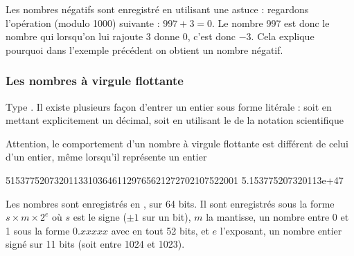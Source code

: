 \documentclass[letterpaper,10pt,english]{sphinxhowto}
\begin{document}
\sphinxAtStartPar
Les nombres négatifs sont enregistré en utilisant une astuce : regardons l’opération (modulo 1000) suivante : \(997 + 3 = 0\). Le nombre 997 est donc le nombre qui lorsqu’on lui rajoute 3 donne 0, c’est donc \(-3\). Cela explique pourquoi dans l’exemple précédent on obtient un nombre négatif.


\subsubsection{Les nombres à virgule flottante}
\label{\detokenize{cours2_nombres_cours:les-nombres-a-virgule-flottante}}
\sphinxAtStartPar
Type . Il existe plusieurs façon d’entrer un entier sous forme litérale : soit en mettant explicitement un  décimal, soit en utilisant le  de la notation scientifique

\begin{sphinxVerbatim}[commandchars=\\\{\}]
  
   
\end{sphinxVerbatim}

\sphinxAtStartPar
Attention, le comportement d’un nombre à virgule flottante est différent de celui d’un entier, même lorsqu’il représente un entier

\begin{sphinxVerbatim}[commandchars=\\\{\}]
  
   
\end{sphinxVerbatim}

\begin{sphinxVerbatim}[commandchars=\\\{\}]
515377520732011331036461129765621272702107522001
5.153775207320113e+47
\end{sphinxVerbatim}

\sphinxAtStartPar
Les nombres sont enregistrés en , sur 64 bits. Il sont enregistrés sous la forme \(s\times m \times 2^e\) où \(s\) est le signe (\(\pm 1\) sur un bit), \(m\) la mantisse, un nombre entre 0 et 1 sous la forme \(0.xxxxx\) avec en tout 52 bits, et \(e\) l’exposant, un nombre entier signé sur 11 bits (soit entre \sphinxhyphen{}1024 et 1023).
\end{document}
